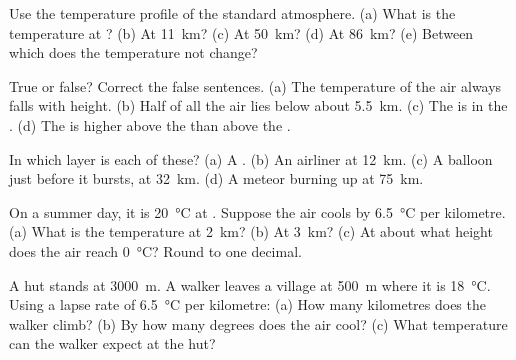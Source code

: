 \begin{exercise}[$\star$]\label{exo:g8:the-atmosphere:2}
Use the temperature profile of the standard atmosphere. (a) What is the
temperature at ? (b) At \qty{11}{km}? (c) At \qty{50}{km}?
(d) At \qty{86}{km}? (e) Between which  does the temperature
not change?
\end{exercise}

\begin{exercise}[$\star$]\label{exo:g8:the-atmosphere:3}
True or false? Correct the false sentences. (a) The temperature of the
air always falls with height. (b) Half of all the air lies below about
\qty{5.5}{km}. (c) The  is in the . (d) The
 is higher above the  than above the .
\end{exercise}

\begin{exercise}[$\star$]\label{exo:g8:the-atmosphere:4}
In which layer is each of these? (a) A  . (b) An airliner at
\qty{12}{km}. (c) A  balloon just before it bursts, at
\qty{32}{km}. (d) A meteor burning up at \qty{75}{km}.
\end{exercise}

\begin{exercise}[$\star\star$]\label{exo:g8:the-atmosphere:5}
On a summer day, it is \qty{20}{\degreeCelsius} at . Suppose the
air cools by \qty{6.5}{\degreeCelsius} per kilometre. (a) What is the
temperature at \qty{2}{km}? (b) At \qty{3}{km}? (c) At about what height
does the air reach \qty{0}{\degreeCelsius}? Round to one decimal.
\end{exercise}

\begin{exercise}[$\star\star$]\label{exo:g8:the-atmosphere:6}
A  hut stands at \qty{3000}{m}. A walker leaves a village at
\qty{500}{m} where it is \qty{18}{\degreeCelsius}. Using a lapse rate of
\qty{6.5}{\degreeCelsius} per kilometre: (a) How many kilometres does
the walker climb? (b) By how many degrees does the air cool? (c) What
temperature can the walker expect at the hut?
\end{exercise}

